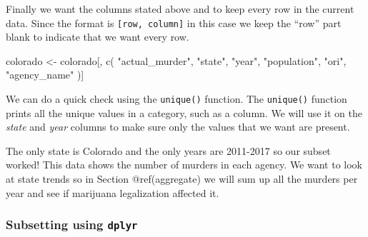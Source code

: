 \documentclass[
  a4paper,
]{krantz}
\makeatletter
\newenvironment{Shaded}{\begin{snugshade}}{\end{snugshade}}
\newcommand{\CommentTok}[1]{\textcolor[rgb]{0.56,0.35,0.01}{\textit{#1}}}
\newcommand{\FunctionTok}[1]{\textcolor[rgb]{0.00,0.00,0.00}{#1}}
\newcommand{\NormalTok}[1]{#1}
\newcommand{\OtherTok}[1]{\textcolor[rgb]{0.56,0.35,0.01}{#1}}
\newcommand{\SpecialCharTok}[1]{\textcolor[rgb]{0.00,0.00,0.00}{#1}}
\newcommand{\StringTok}[1]{\textcolor[rgb]{0.31,0.60,0.02}{#1}}
\newenvironment{kframe}{%
\medskip{}
\setlength{\fboxsep}{.8em}
 \def\at@end@of@kframe{}%
 \ifinner\ifhmode%
  \def\at@end@of@kframe{\end{minipage}}%
  \begin{minipage}{\columnwidth}%
 \fi\fi%
 \def\FrameCommand##1{\hskip\@totalleftmargin \hskip-\fboxsep
 \colorbox{shadecolor}{##1}\hskip-\fboxsep
     \hskip-\linewidth \hskip-\@totalleftmargin \hskip\columnwidth}%
 \MakeFramed {\advance\hsize-\width
   \@totalleftmargin\z@ \linewidth\hsize
   \@setminipage}}%
 {\par\unskip\endMakeFramed%
 \at@end@of@kframe}
\renewenvironment{Shaded}{\begin{kframe}}{\end{kframe}}
\makeatother
\begin{document}
Finally we want the columns stated above and to keep every
row in the current data. Since the format is
\texttt{{[}row,\ column{]}} in this case we keep the ``row''
part blank to indicate that we want every row.

\begin{Shaded}
\begin{Highlighting}[]
\NormalTok{colorado }\OtherTok{\textless{}{-}}\NormalTok{ colorado[, }\FunctionTok{c}\NormalTok{(}
  \StringTok{"actual\_murder"}\NormalTok{,}
  \StringTok{"state"}\NormalTok{,}
  \StringTok{"year"}\NormalTok{,}
  \StringTok{"population"}\NormalTok{,}
  \StringTok{"ori"}\NormalTok{,}
  \StringTok{"agency\_name"}
\NormalTok{)]}
\end{Highlighting}
\end{Shaded}

We can do a quick check using the \texttt{unique()}
function. The \texttt{unique()} function prints all the
unique values in a category, such as a column. We will use
it on the \emph{state} and \emph{year} columns to make sure
only the values that we want are present.

\begin{Shaded}
\end{Shaded}

\begin{Shaded}
\end{Shaded}

The only state is Colorado and the only years are 2011-2017
so our subset worked! This data shows the number of murders
in each agency. We want to look at state trends so in
Section @ref(aggregate) we will sum up all the murders per
year and see if marijuana legalization affected it.

\hypertarget{subsetting-using-dplyr}{%
\subsubsection{\texorpdfstring{Subsetting using
\texttt{dplyr}}{Subsetting using dplyr}}\label{subsetting-using-dplyr}}
\end{document}
